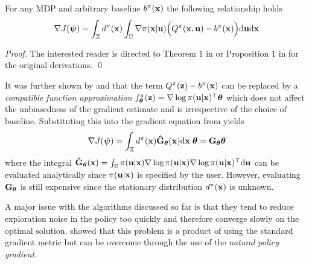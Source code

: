 \begin{theo}
For any MDP and arbitrary baseline $b^\pi(\mathbf{x})$ the following relationship holds 
\begin{equation*}
\nabla  J(\boldsymbol{\psi}) = \int_{\mathbb{X}} d^\pi(\mathbf{x}) \int_{\mathbb{U}} \nabla  \pi(\mathbf{x}|\mathbf{u}) \Big( Q^\pi(\mathbf{x},\mathbf{u}) - b^\pi(\mathbf{x}) \Big) \mathrm{d}\mathbf{u}\mathrm{d}\mathbf{x}
\end{equation*}
\label{theo:polgrad}
\end{theo}
\begin{proof}
The interested reader is directed to Theorem 1 in \cite{MT01} or Proposition 1 in \cite{SMSM00} for the original derivations.
\qed
\end{proof}

It was further shown by \cite{MT01} and \cite{SMSM00} that the term $Q^\pi(\mathbf{z}) - b^\pi(\mathbf{x})$ can be replaced by a \textit{compatible function approximation} 
$f^\pi_{\boldsymbol{\theta}}(\mathbf{z}) = \nabla  \log \pi(\mathbf{u}|\mathbf{x})^\top \boldsymbol{\theta} $
which does not affect the unbiasedness of the gradient estimate and is irrespective of the choice of baseline. Substituting this into the gradient equation from  yields
\begin{equation*}
\nabla  J(\boldsymbol{\psi}) = \int_{\mathbb{X}} d^\pi(\mathbf{x}) \mathbf{\hat G}_{\boldsymbol{\theta}}(\mathbf{x}) \mathrm{d}\mathbf{x} \; \boldsymbol{\theta} = \mathbf{G}_{\boldsymbol{\theta}} \boldsymbol{\theta}
\end{equation*}
where the integral $\mathbf{\hat G}_{\boldsymbol{\theta}}(\mathbf{x}) = \int_{\mathbb{U}} \pi(\mathbf{u}|\mathbf{x})\nabla \log\pi(\mathbf{u}|\mathbf{x})\nabla \log\pi(\mathbf{u}|\mathbf{x})^\top \mathrm{d}\mathbf{u}$ can be evaluated analytically since $\pi(\mathbf{u}|\mathbf{x})$ is specified by the user. However, evaluating $\mathbf{G}_{\boldsymbol{\theta}}$ is still expensive since the stationary distribution $d^\pi(\mathbf{x})$ is unknown.

A major issue with the algorithms discussed so far is that they tend to reduce exploration noise in the policy too quickly and therefore converge slowly on the optimal solution. \cite{Kak02} showed that this problem is a product of using the standard gradient metric but can be overcome through the use of the \textit{natural policy gradient}.


